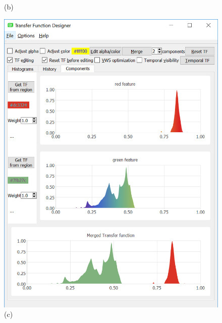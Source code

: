 \documentclass[twoside,twocolumn,10pt]{article}
\begin{document}
\begin{figure}
\begin{minipage}{.16\textwidth}
		(b)
	\end{minipage}
	\begin{minipage}{.16\textwidth}
		\centering
		\includegraphics[width=1\linewidth]{tf_supernova_merged_red_green}
		(c)
	\end{minipage}~
	\begin{minipage}{.16\textwidth}
		\centering

\end{minipage}
\end{figure}
\end{document}
